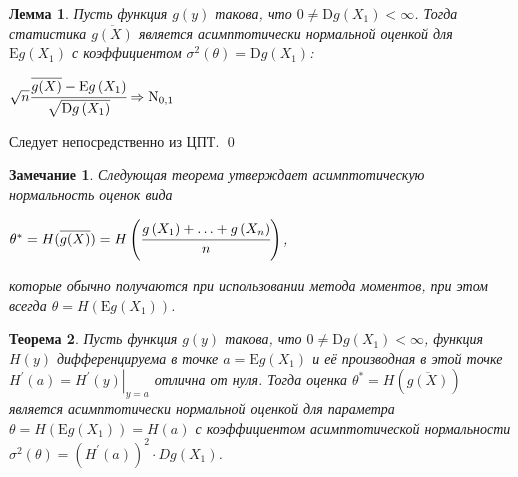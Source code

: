 \documentclass[oneside,final,14pt]{extreport}
\renewenvironment{proof}{{\bfseries Доказательство.}}{\qed}
\newtheorem{thm}{Теорема}[section]
\newtheorem{lem}[thm]{Лемма}
\newtheorem*{rmrk}{Замечание}
\theoremstyle{definition}
\begin{document}
\begin{lem}
Пусть функция \(g(y)\) такова, что \(0 \neq \mathrm{D} g\left(X_{1}\right)<\infty\). Тогда статистика \(\overline{g(X)}\) является асимптотически нормальной оценкой для \(\mathrm{E} g\left(X_{1}\right)\) с коэффициентом \(\sigma^{2}(\theta)=\mathrm{D} g\left(X_{1}\right)\):

\( \sqrt{n} \cfrac{\overline{g(X)}-\mathrm{E} g\left(X_{1}\right)}{\sqrt{\mathrm{D} g\left(X_{1}\right)}} \Rightarrow \mathrm{N}_{0,1} \)
\end{lem}

\begin{proof}
Следует непосредственно из ЦПТ.
\end{proof}

\begin{rmrk}
Следующая теорема утверждает асимптотическую нормальность оценок вида

\(\theta^{*}=H(\overline{g(X)})=H\left(\cfrac{g\left(X_{1}\right)+\ldots+g\left(X_{n}\right)}{n}\right)\),

которые обычно получаются при использовании метода моментов, при этом всегда \(\theta=H\left(\mathrm{E} g\left(X_{1}\right)\right)\).
\end{rmrk}

\begin{thm}
Пусть функция \(g(y)\) такова, что \(0 \neq \mathrm{D} g\left(X_{1}\right)<\infty\), функция \(H(y)\) дифференцируема в точке \(a=\mathrm{E} g\left(X_{1}\right)\) и её производная в этой точке \(H^{\prime}(a)=\left.H^{\prime}(y)\right|_{y=a}\) отлична от нуля. Тогда оценка \(\theta^{*}=H(\overline{g(X)})\)
является асимптотически нормальной
оценкой для параметра \(\theta=H\left(\mathrm{E} g\left(X_{1}\right)\right)=H(a)\) с коэффициентом асимптотической нормальности \(\sigma^{2}(\theta)=\left(H^{\prime}(a)\right)^{2} \cdot D g\left(X_{1}\right)\).
\end{thm}
\end{document}
